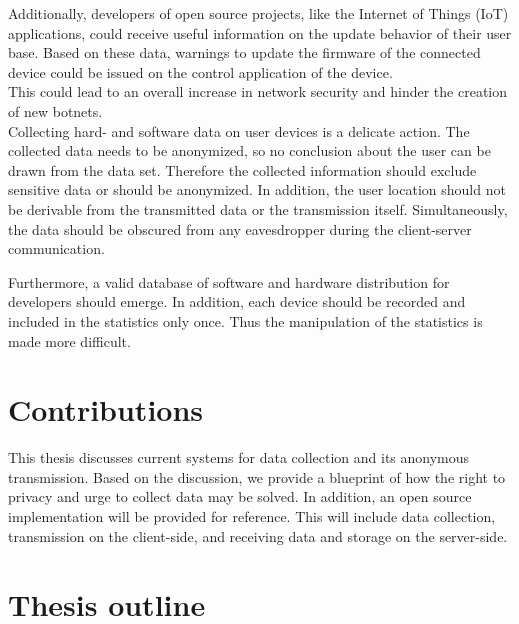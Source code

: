 Additionally, developers of open source projects, like the Internet of Things (IoT) applications, could receive useful
information on the update behavior of their user base. Based on these data, warnings to update the firmware of the
connected device could be issued on the control application of the device.\\
This could lead to an overall increase in network security and hinder the creation of new botnets.\\

Collecting hard- and software data on user devices is a delicate action. The collected data needs to be anonymized,
so no conclusion about the user can be drawn from the data set. Therefore the collected information should exclude
sensitive data or should be anonymized. 
In addition, the user location should not be derivable from the transmitted data or the transmission itself. Simultaneously, the data should be obscured from any eavesdropper during the client-server communication.

Furthermore, a valid database of software and hardware distribution for developers should emerge. In addition,
each device should be recorded and included in the statistics only once.
Thus the manipulation of the statistics is made more difficult.



\section{Contributions}
\label{sec:intro:contrib}
%

This thesis discusses current systems for data collection and its anonymous transmission. Based on the discussion, we provide a blueprint of how the right to privacy and urge to collect data may be solved.
In addition, an open source implementation will be provided for reference.
This will include data collection, transmission on the client-side, and receiving data and storage on the server-side.

\section{Thesis outline}
\label{sec:intro:outline}

